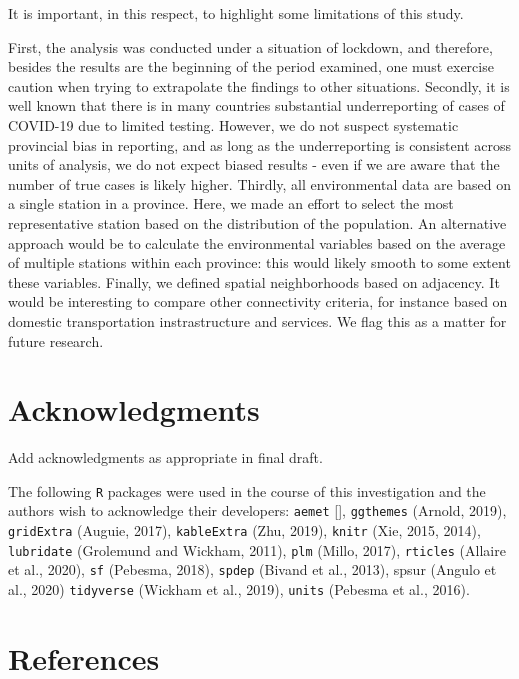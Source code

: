\documentclass[]{elsarticle} %
\begin{document}
It is important, in this respect, to highlight some limitations of this
study.

First, the analysis was conducted under a situation of lockdown, and
therefore, besides the results are the beginning of the period examined,
one must exercise caution when trying to extrapolate the findings to
other situations. Secondly, it is well known that there is in many
countries substantial underreporting of cases of COVID-19 due to limited
testing. However, we do not suspect systematic provincial bias in
reporting, and as long as the underreporting is consistent across units
of analysis, we do not expect biased results - even if we are aware that
the number of true cases is likely higher. Thirdly, all environmental
data are based on a single station in a province. Here, we made an
effort to select the most representative station based on the
distribution of the population. An alternative approach would be to
calculate the environmental variables based on the average of multiple
stations within each province: this would likely smooth to some extent
these variables. Finally, we defined spatial neighborhoods based on
adjacency. It would be interesting to compare other connectivity
criteria, for instance based on domestic transportation instrastructure
and services. We flag this as a matter for future research.

\hypertarget{acknowledgments}{%
\section*{Acknowledgments}\label{acknowledgments}}

Add acknowledgments as appropriate in final draft.

The following \texttt{R} packages were used in the course of this
investigation and the authors wish to acknowledge their developers:
\texttt{aemet} {[}{]}, \texttt{ggthemes} (Arnold, 2019),
\texttt{gridExtra} (Auguie, 2017), \texttt{kableExtra} (Zhu, 2019),
\texttt{knitr} (Xie, 2015, 2014), \texttt{lubridate} (Grolemund and
Wickham, 2011), \texttt{plm} (Millo, 2017), \texttt{rticles} (Allaire et
al., 2020), \texttt{sf} (Pebesma, 2018), \texttt{spdep} (Bivand et al.,
2013), spsur (Angulo et al., 2020) \texttt{tidyverse} (Wickham et al.,
2019), \texttt{units} (Pebesma et al., 2016).

\hypertarget{references}{%
\section*{References}\label{references}}
\end{document}
